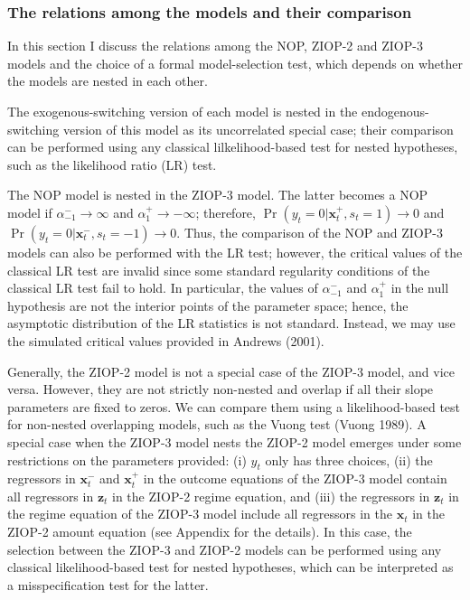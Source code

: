 \documentclass[letterpaper,fleqn,12pt]{article}
\begin{document}
\begin{onehalfspace}
\subsubsection*{\noindent The relations among the models and their comparison%
}

In this section I discuss the relations among the NOP, ZIOP-2 and ZIOP-3
models and the choice of a formal model-selection test, which depends on
whether the models are nested in each other.

The exogenous-switching version of each model is nested in the
endogenous-switching version of this model as its uncorrelated special case;
their comparison can be performed using any classical lilkelihood-based test
for nested hypotheses, such as the likelihood ratio (LR) test.

The NOP model is nested in the ZIOP-3 model. The latter becomes a NOP model
if $\alpha _{-1}^{-}\rightarrow \infty $ and $\alpha _{1}^{+}\rightarrow
-\infty $; therefore, $\Pr (y_{t}=0|\mathbf{x}_{t}^{+},s_{t}=1)\rightarrow 0$
and $\Pr (y_{t}=0|\mathbf{x}_{t}^{-},s_{t}=-1)\rightarrow 0$. Thus, the
comparison of the NOP and ZIOP-3 models can also be performed with the LR
test; however, the critical values of the classical LR test are invalid
since some standard regularity conditions of the classical LR test fail to
hold. In particular, the values of $\alpha _{-1}^{-}$ and $\alpha _{1}^{+}$
in the null hypothesis are not the interior points of the parameter space;
hence, the asymptotic distribution of the LR statistics is not standard.
Instead, we may use the simulated critical values provided in Andrews (2001).

Generally, the ZIOP-2 model is not a special case of the ZIOP-3 model, and
vice versa. However, they are not strictly non-nested and overlap if all
their slope parameters are fixed to zeros. We can compare them using a
likelihood-based test for non-nested overlapping models, such as the Vuong
test (Vuong 1989). A special case when the ZIOP-3 model nests the ZIOP-2
model emerges under some restrictions on the parameters provided: (i) $y_{t}$
only has three choices, (ii) the regressors in $\mathbf{x}_{t}^{-}$ and $%
\mathbf{x}_{t}^{+}$ in the outcome equations of the ZIOP-3 model contain all
regressors in $\mathbf{z}_{t}$ in the ZIOP-2 regime equation, and (iii) the
regressors in $\mathbf{z}_{t}$ in the regime equation of the ZIOP-3 model
include all regressors in the $\mathbf{x}_{t}$ in the ZIOP-2 amount equation
(see Appendix for the details). In this case, the selection between the
ZIOP-3 and ZIOP-2 models can be performed using any classical
likelihood-based test for nested hypotheses, which can be interpreted as a
misspecification test for the latter.


\end{onehalfspace}
\end{document}
